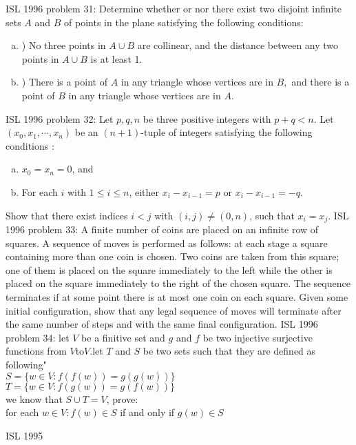 ISL 1996 problem 31:  Determine whether or nor there exist two disjoint infinite sets $ A$ and $ B$ of points in the plane satisfying the following conditions:
\begin{enumerate}[a.]
  \item ) No three points in $ A \cup B$ are collinear, and the distance between any two points in $ A \cup B$ is at least 1.
  \item ) There is a point of $ A$ in any triangle whose vertices are in $ B,$ and there is a point of $ B$ in any triangle whose vertices are in $ A.$
\end{enumerate} 
ISL 1996 problem 32:  Let $ p,q,n$ be three positive integers with $ p + q < n$. Let $ (x_0,x_1,\cdots ,x_n)$ be an $ (n + 1)$-tuple of integers satisfying the following conditions :
\begin{enumerate}[(a)]
  \item $ x_0 = x_n = 0$, and
  \item For each $ i$ with $ 1\leq i\leq n$, either $ x_i - x_{i - 1} = p$ or $ x_i - x_{i - 1} = - q$.
\end{enumerate}
Show that there exist indices $ i < j$ with $ (i,j)\neq (0,n)$, such that $ x_i = x_j$. 
ISL 1996 problem 33:  A finite number of coins are placed on an infinite row of squares. A sequence of moves is performed as follows: at each stage a square containing more than one coin is chosen. Two coins are taken from this square; one of them is placed on the square immediately to the left while the other is placed on the square immediately to the right of the chosen square. The sequence terminates if at some point there is at most one coin on each square. Given some initial configuration, show that any legal sequence of moves will terminate after the same number of steps and with the same final configuration. 
ISL 1996 problem 34:  let $ V$ be a finitive  set and $ g$ and $ f$ be two injective surjective functions from $ V$to$ V$.let $ T$ and $ S$ be two sets such that they are defined as following" \\
$ S = \{w \in V: f(f(w)) = g(g(w))\}$ \\
$ T = \{w \in V: f(g(w)) = g(f(w))\}$ \\
we know that $ S \cup T = V$, prove: \\
for each $ w \in V : f(w) \in S$ if and only if $ g(w) \in S$ 

ISL 1995 

